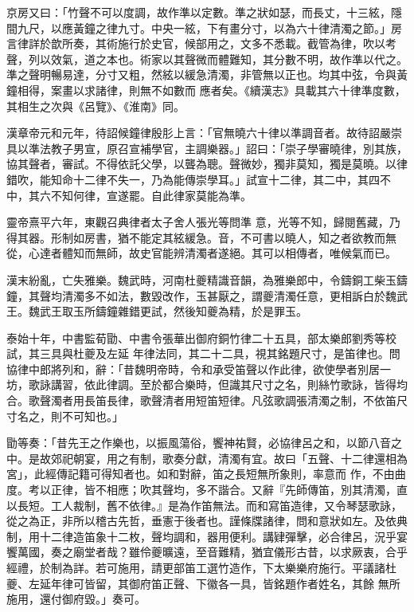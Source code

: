 \begin{pinyinscope}
 京房又曰：「竹聲不可以度調，故作準以定數。準之狀如瑟，而長丈，十三絃，隱間九尺，以應黃鐘之律九寸。中央一絃，下有畫分寸，以為六十律清濁之節。」房言律詳於歆所奏，其術施行於史官，候部用之，文多不悉載。截管為律，吹以考聲，列以效氣，道之本也。術家以其聲微而體難知，其分數不明，故作準以代之。準之聲明暢易達，分寸又粗，然絃以緩急清濁，非管無以正也。均其中弦，令與黃鐘相得，案畫以求諸律，則無不如數而
 應者矣。《續漢志》具載其六十律準度數，其相生之次與《呂覽》、《淮南》同。



 漢章帝元和元年，待詔候鐘律殷肜上言：「官無曉六十律以準調音者。故待詔嚴崇具以準法教子男宣，原召宣補學官，主調樂器。」詔曰：「崇子學審曉律，別其族，協其聲者，審試。不得依託父學，以聾為聰。聲微妙，獨非莫知，獨是莫曉。以律錯吹，能知命十二律不失一，乃為能傳崇學耳。」試宣十二律，其二中，其四不中，其六不知何律，宣遂罷。自此律家莫能為準。



 靈帝熹平六年，東觀召典律者太子舍人張光等問準
 意，光等不知，歸閱舊藏，乃得其器。形制如房書，猶不能定其絃緩急。音，不可書以曉人，知之者欲教而無從，心達者體知而無師，故史官能辨清濁者遂絕。其可以相傳者，唯候氣而已。



 漢末紛亂，亡失雅樂。魏武時，河南杜夔精識音韻，為雅樂郎中，令鑄銅工柴玉鑄鐘，其聲均清濁多不如法，數毀改作，玉甚厭之，謂夔清濁任意，更相訴白於魏武王。魏武王取玉所鑄鐘雜錯更試，然後知夔為精，於是罪玉。



 泰始十年，中書監荀勖、中書令張華出御府銅竹律二十五具，部太樂郎劉秀等校試，其三具與杜夔及左延
 年律法同，其二十二具，視其銘題尺寸，是笛律也。問協律中郎將列和，辭：「昔魏明帝時，令和承受笛聲以作此律，欲使學者別居一坊，歌詠講習，依此律調。至於都合樂時，但識其尺寸之名，則絲竹歌詠，皆得均合。歌聲濁者用長笛長律，歌聲清者用短笛短律。凡弦歌調張清濁之制，不依笛尺寸名之，則不可知也。」



 勖等奏：「昔先王之作樂也，以振風蕩俗，饗神祐賢，必協律呂之和，以節八音之中。是故郊祀朝宴，用之有制，歌奏分獻，清濁有宜。故曰「五聲、十二律還相為宮」，此經傳記籍可得知者也。如和對辭，笛之長短無所象則，率意而
 作，不由曲度。考以正律，皆不相應；吹其聲均，多不諧合。又辭『先師傳笛，別其清濁，直以長短。工人裁制，舊不依律。』是為作笛無法。而和寫笛造律，又令琴瑟歌詠，從之為正，非所以稽古先哲，垂憲于後者也。謹條牒諸律，問和意狀如左。及依典制，用十二律造笛象十二枚，聲均調和，器用便利。講肄彈擊，必合律呂，況乎宴饗萬國，奏之廟堂者哉？雖伶夔曠遠，至音難精，猶宜儀形古昔，以求厥衷，合乎經禮，於制為詳。若可施用，請更部笛工選竹造作，下太樂樂府施行。平議諸杜夔、左延年律可皆留，其御府笛正聲、下徽各一具，皆銘題作者姓名，其餘
 無所施用，還付御府毀。」奏可。




\end{pinyinscope}
